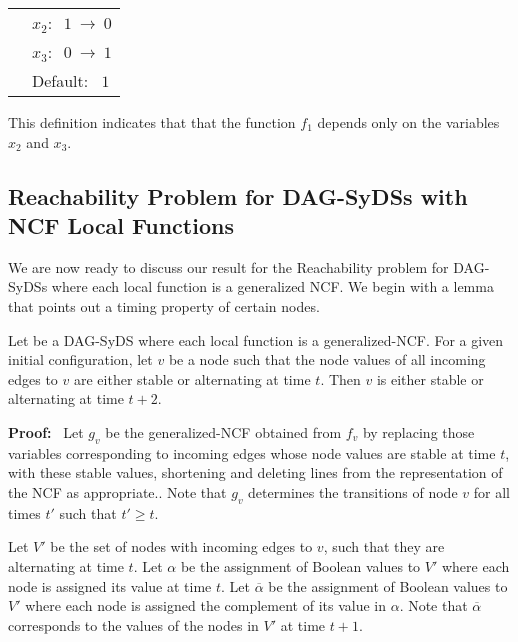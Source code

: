 \medskip

\noindent
\begin{tabular}{ll}
\hspace*{1.1in} & $x_2:~$  $1 ~\longrightarrow~ 0$ \\ [1ex]
\hspace*{1.1in} & $x_3:~$  $0 ~\longrightarrow~ 1$ \\ [1ex]
\hspace*{1.1in} & Default:~ $1$ \\
\end{tabular}

\smallskip

\noindent
This definition indicates that that the function $f_1$
depends only on the variables $x_2$ and $x_3$.

\medskip

\noindent
\subsection{Reachability Problem for DAG-SyDSs with NCF Local Functions}

\medskip

We are now ready to discuss our result for the Reachability problem
for DAG-SyDSs where each local function is a generalized NCF.
We begin with a lemma that points out a timing property of certain nodes.

\begin{lemma}\label{lem:ncf_plus_two}
Let \cals{} be a DAG-SyDS where each local function is a generalized-NCF.
For a given initial configuration,
let $v$ be a node such that the node values of all incoming edges to $v$
are  either stable or alternating at time $t$.
Then  $v$ is either stable or alternating at time $t+2$.
\end{lemma}

\medskip

\noindent
\textbf{Proof:}~ Let $g_v$ be the generalized-NCF obtained from
$f_v$ by replacing those variables corresponding to incoming edges
whose node values are stable at time $t$, with these stable values,
shortening and deleting lines from the representation of the NCF
as appropriate..  Note that $g_v$ determines the transitions of
node $v$ for all times $t'$ such that $t' \geq t$.

Let $V'$ be the set of nodes with incoming edges to $v$, such that
they are alternating at time $t$.  Let $\alpha$  be the assignment
of Boolean values to $V'$ where each node  is assigned its value
at time $t$.  Let $\overline{\alpha}$  be the assignment of Boolean
values to $V'$ where each node  is assigned the complement of its
value in $\alpha$.  Note that $\overline{\alpha}$ corresponds to
the values of the nodes in $V'$ at time $t+1$.

